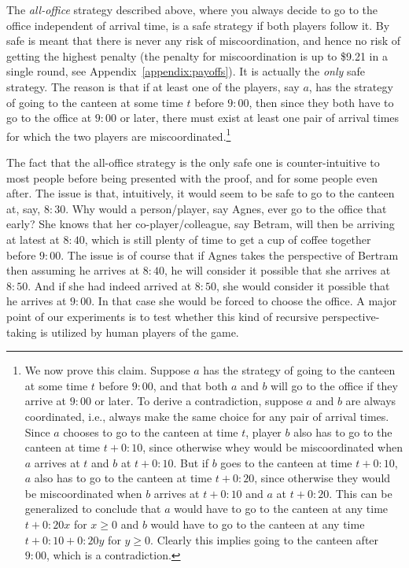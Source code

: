 \documentclass[twocolumn,a4paper,superscriptaddress,nofootinbib]{revtex4}
\begin{document}
The \emph{all-office} strategy described above, where you always decide to go to the office independent of arrival time, is a safe strategy if both players follow it. By safe is meant that there is never any risk of miscoordination, and hence no risk of getting the highest penalty (the penalty for miscoordination is up to \$9.21 in a single round, see Appendix~\ref{appendix:payoffs}). It is actually the \emph{only} safe strategy. The reason is that if at least one of the players, say $a$, has the strategy of going to the canteen at some time $t$ before $9{:}00$, then since they both have to go to the office at $9{:}00$ or later, there must exist at least one pair of arrival times for which the two players are miscoordinated.\footnote{
\label{footnote:no-cutoff}  
We now prove this claim. Suppose $a$ has the strategy of going to the canteen at some time $t$ before $9{:}00$, and that both $a$ and $b$ will go to the office if they arrive at $9{:}00$ or later. To derive a contradiction, suppose $a$ and $b$ are always coordinated, i.e., always make the same choice for any pair of arrival times. Since $a$ chooses to go to the canteen at time $t$, player $b$ also has to go to the canteen at time $t+0{:}10$, since otherwise whey would be miscoordinated when $a$ arrives at $t$ and $b$ at $t+0{:}10$. But if $b$ goes to the canteen at time $t+0{:}10$, $a$ also has to go to the canteen at time $t+0{:}20$, since otherwise they would be miscoordinated when $b$ arrives at $t+0{:}10$ and $a$ at $t+0{:}20$. This can be generalized to conclude  that $a$ would have to go to the canteen at any time $t+0{:}20x$ for $x \geq 0$ and $b$ would have to go to the canteen at any time $t+0{:}10+0{:}20y$ for $y \geq 0$. Clearly this implies going to the canteen after $9{:}00$, which is a contradiction.}

The fact that the all-office strategy is the only safe one is counter-intuitive to most people before being presented with the proof, and for some people even after. The issue is that, intuitively, it would seem to be safe to go to the canteen at, say, $8{:}30$. Why would a person/player, say Agnes, ever go to the office that early? She knows that her co-player/colleague, say Betram, will then be arriving at latest at $8{:}40$, which is still plenty of time to get a cup of coffee together before $9{:}00$. The issue is of course that if Agnes takes the perspective of Bertram then assuming he arrives at $8{:}40$, he will consider it possible that she arrives at $8{:}50$. And if she had indeed arrived at $8{:}50$, she would consider it possible that he arrives at $9{:}00$. In that case she would be forced to choose the office. A major point of our experiments is to test whether this kind of recursive perspective-taking is utilized by human players of the game.
\end{document}
